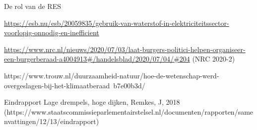 \begin{voorstel}{De rol van de RES}
\begin{multicols*}{2}
\url{https://esb.nu/esb/20059835/gebruik-van-waterstof-in-elektriciteitssector-voorlopig-onnodig-en-inefficient}

\url{https://www.nrc.nl/nieuws/2020/07/03/laat-burgers-politici-helpen-organiseer-een-burgerberaad-a4004913#/handelsblad/2020/07/04/#204} (NRC 2020-2)

https://www.trouw.nl/duurzaamheid-natuur/hoe-de-wetenschap-werd-overgeslagen-bij-het-klimaatberaad~b7e00b3d/

Eindrapport Lage drempels, hoge dijken, Remkes, J, 2018 (https://www.staatscommissieparlementairstelsel.nl/documenten/rapporten/samenvattingen/12/13/eindrapport)

\end{multicols*}

\end{voorstel}
